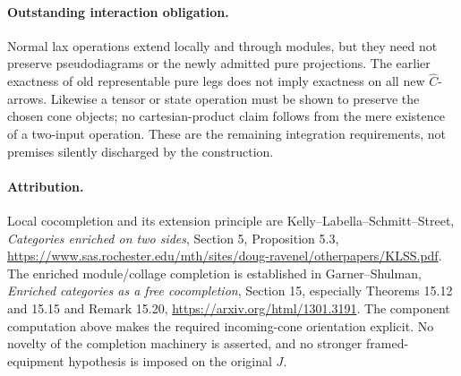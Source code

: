 \documentclass{article}
\begin{document}
\paragraph{Outstanding interaction obligation.} Normal lax operations extend locally and through modules, but they need not preserve pseudodiagrams or the newly admitted pure projections. The earlier exactness of old representable pure legs does not imply exactness on all new $\widehat C$-arrows. Likewise a tensor or state operation must be shown to preserve the chosen cone objects; no cartesian-product claim follows from the mere existence of a two-input operation. These are the remaining integration requirements, not premises silently discharged by the construction.

\paragraph{Attribution.} Local cocompletion and its extension principle are Kelly--Labella--Schmitt--Street, \emph{Categories enriched on two sides}, Section 5, Proposition 5.3, \url{https://www.sas.rochester.edu/mth/sites/doug-ravenel/otherpapers/KLSS.pdf}. The enriched module/collage completion is established in Garner--Shulman, \emph{Enriched categories as a free cocompletion}, Section 15, especially Theorems 15.12 and 15.15 and Remark 15.20, \url{https://arxiv.org/html/1301.3191}. The component computation above makes the required incoming-cone orientation explicit. No novelty of the completion machinery is asserted, and no stronger framed-equipment hypothesis is imposed on the original $J$.
\end{document}
